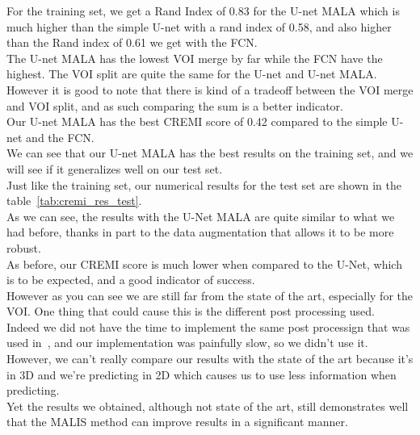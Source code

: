 For the training set, we get a Rand Index of 0.83 for the U-net MALA which is much higher than the simple U-net with a rand index of 0.58, and also higher than the Rand index of 0.61 we get with the FCN.\\
The U-net MALA has the lowest VOI merge by far while the FCN have the highest. The VOI split are quite the same for the U-net and U-net MALA.\\
However it is good to note that there is kind of a tradeoff between the VOI merge and VOI split, and as such comparing the sum is a better indicator.\\
Our U-net MALA has the best CREMI score of 0.42 compared to the simple U-net and the FCN.\\ 
We can see that our U-net MALA has the best results on the training set, and we
will see if it generalizes well on our test set.\\

Just like the training set, our numerical results for the test set are shown in the table~\ref{tab:cremi_res_test}.\\
As we can see, the results with the U-Net MALA are quite similar to what we had before, thanks in part to the data augmentation that allows it to be more robust.\\
As before, our CREMI score is much lower when compared to the U-Net, which is to be expected, and a good indicator of success.\\

However as you can see we are still far from the state of the art, especially for the VOI. One thing that could cause this is the different post processing used.\\ 
Indeed we did not have the time to implement the same post processign that was
used in~\cite{funke_large_2019}, and our implementation was painfully slow, so
we didn't use it.\\
However, we can’t really compare our results with the state of the art because it’s in 3D and we’re predicting in 2D which causes us to use less information when predicting.\\
Yet the results we obtained, although not state of the art, still demonstrates
well that the MALIS method can improve results in a significant manner.\\
